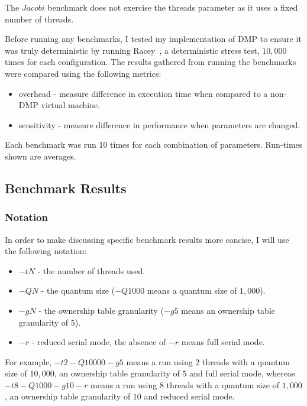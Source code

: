 The $Jacobi$ benchmark does not exercise the threads parameter as it
uses a fixed number of threads.

Before running any benchmarks, I tested my implementation of DMP to
ensure it was truly deterministic by running Racey~\cite{racey}, a
deterministic stress test, $10,000$ times for each configuration.  The
results gathered from running the benchmarks were compared using
the following metrics:

\begin{itemize}
\item overhead - measure difference in execution time when compared to
  a non-DMP virtual machine.

\item sensitivity - measure difference in performance when parameters
  are changed.
\end{itemize}

Each benchmark was run 10 times for each combination of parameters.
Run-times shown are averages.

\subsection{Benchmark Results}

\subsubsection{Notation}

In order to make discussing specific benchmark results more concise, I
will use the following notation:

\begin{itemize}
\item $-tN$ - the number of threads used.

\item $-QN$ - the quantum size ($-Q1000$ means a quantum size of
  $1,000$).

\item $-gN$ - the ownership table granularity ($-g5$ means an
  ownership table granularity of $5$).

\item $-r$ - reduced serial mode, the absence of $-r$ means full
  serial mode.
\end{itemize}

For example, $-t2 -Q10000 -g5$ means a run using 2 threads with a
quantum size of $10,000$, an ownership table granularity of $5$ and
full serial mode, whereas $-t8 -Q1000 -g10 -r$ means a run using 8
threads with a quantum size of $1,000$, an ownership table granularity
of $10$ and reduced serial mode.

